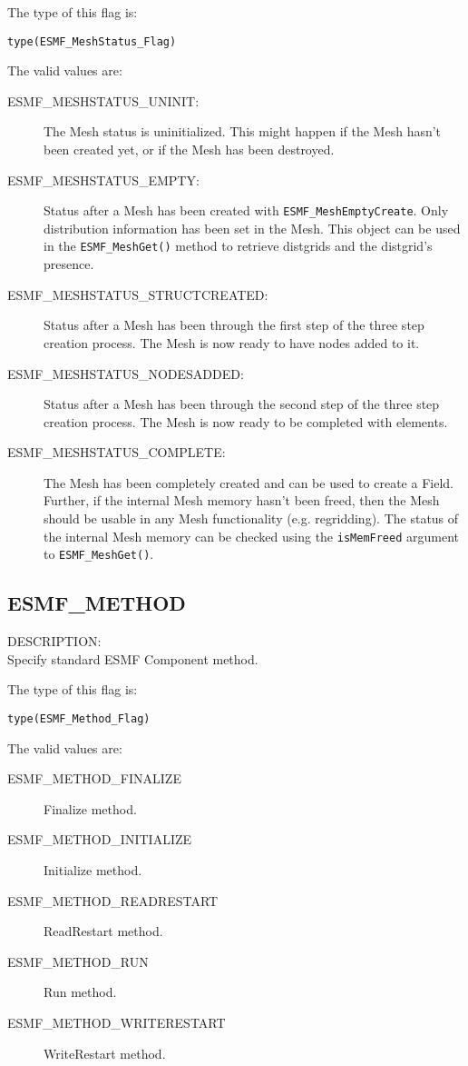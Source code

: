 The type of this flag is:

{\tt type(ESMF\_MeshStatus\_Flag)}

The valid values are:
\begin{description}
\item [ESMF\_MESHSTATUS\_UNINIT:] The Mesh status is uninitialized. This might
       happen if the Mesh hasn't been created yet, or if the Mesh has been destroyed.
\item [ESMF\_MESHSTATUS\_EMPTY:] Status after a Mesh has been created with 
      {\tt ESMF\_MeshEmptyCreate}.  Only distribution information has been set in the Mesh. 
      This object can be used in the {\tt ESMF\_MeshGet()}
      method to retrieve distgrids and the distgrid's presence.  
\item [ESMF\_MESHSTATUS\_STRUCTCREATED:] Status after a Mesh has been through the first
      step of the three step creation process. The Mesh is now ready to have nodes added
      to it. 
\item [ESMF\_MESHSTATUS\_NODESADDED:] Status after a Mesh has been through the second
      step of the three step creation process. The Mesh is now ready to be completed with 
      elements. 
\item [ESMF\_MESHSTATUS\_COMPLETE:] The Mesh has been completely created 
      and can be used to create a Field. Further, if the internal Mesh memory hasn't been
      freed, then the Mesh should be usable in any Mesh functionality (e.g. 
      regridding). The status of the internal Mesh memory can be checked using
      the {\tt isMemFreed} argument to {\tt ESMF\_MeshGet()}.
\end{description}

\subsection{ESMF\_METHOD}
\label{const:method}

{\sf DESCRIPTION:\\}  
Specify standard ESMF Component method.

The type of this flag is:

{\tt type(ESMF\_Method\_Flag)}

The valid values are:
\begin{description}
\item [ESMF\_METHOD\_FINALIZE]
      Finalize method.
\item [ESMF\_METHOD\_INITIALIZE]
      Initialize method.
\item [ESMF\_METHOD\_READRESTART]
      ReadRestart method.
\item [ESMF\_METHOD\_RUN]
      Run method.
\item [ESMF\_METHOD\_WRITERESTART]
      WriteRestart method.
\end{description}


